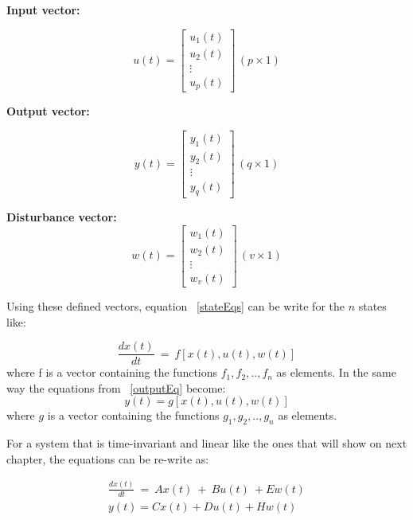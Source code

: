 \textbf{ Input vector:}
 
  \begin{equation}
 u(t)=
 \left[
 \begin{matrix}
 u_1(t)\\
 u_2(t)\\
 \vdots\\
 u_p(t)
 \end{matrix}
 \right] \, (p\times 1)
 \end{equation}
 
 \textbf{ Output vector:}
 
   \begin{equation}
y(t)=
 \left[
 \begin{matrix}
 y_1(t)\\
 y_2(t)\\
 \vdots\\
 y_q(t)
 \end{matrix}
 \right] \, (q\times 1)
 \end{equation}
 
\textbf{ Disturbance vector:}
    \begin{equation}
 w(t)=
 \left[
 \begin{matrix}
 w_1(t)\\
 w_2(t)\\
 \vdots\\
 w_v(t)
 \end{matrix}
 \right] \, (v\times 1)
 \end{equation}
 
 Using these defined vectors, equation ~\ref{stateEqs} can be write for the $n$ states like:\smallskip
 
 \begin{equation}
 	\frac{dx(t)}{dt}~=~ f[x(t),u(t),w(t)]
 \end{equation} 
 where f is a vector containing the functions $f_1,f_2,..,f_n$ as elements. In the same way the equations from ~\ref{outputEq} become:
 \begin{equation}
 	y(t)=g[x(t),u(t),w(t)]
 \end{equation}
 where $g$ is a vector containing the functions $g_1,g_2,..,g_n$ as elements.
 
 For a system that is time-invariant and linear like the ones that will show on next chapter, the equations can be re-write as:
 
 \begin{align}
	\frac{dx(t)}{dt}~=~ Ax(t)~+~Bu(t)~+Ew(t) \\
	y(t)=Cx(t)+Du(t)+Hw(t)
 \end{align}

